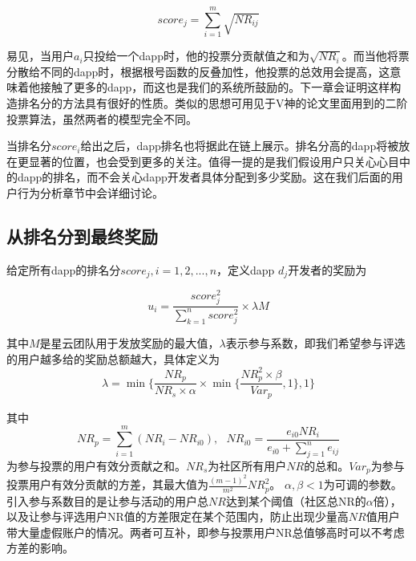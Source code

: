 $$score_j = \sum_{i=1}^m \sqrt{NR_{ij}}$$

易见，当用户$a_i$只投给一个dapp时，他的投票分贡献值之和为$\sqrt{NR_i}$。而当他将票分散给不同的dapp时，根据根号函数的反叠加性，他投票的总效用会提高，这意味着他接触了更多的dapp，而这也是我们的系统所鼓励的。下一章会证明这样构造排名分的方法具有很好的性质。类似的思想可用见于V神的论文\cite{buterin2018liberal}里面用到的二阶投票算法，虽然两者的模型完全不同。

当排名分$score_i$给出之后，dapp排名也将据此在链上展示。排名分高的dapp将被放在更显著的位置，也会受到更多的关注。值得一提的是我们假设用户只关心心目中的dapp的排名，而不会关心dapp开发者具体分配到多少奖励。这在我们后面的用户行为分析章节中会详细讨论。

\subsection{从排名分到最终奖励}
给定所有dapp的排名分$score_j,i=1,2,...,n$，定义dapp $d_j$开发者的奖励为

$$u_i = \frac{score_j^2}{\sum_{k=1}^n score_j^2}\times \lambda M$$

其中$M$是星云团队用于发放奖励的最大值，$\lambda $表示参与系数，即我们希望参与评选的用户越多给的奖励总额越大，具体定义为
$$\lambda=\min\{\frac{NR_p}{NR_s\times \alpha}\times \min\{\frac{NR_p^2\times \beta}{Var_p},1\},1\}$$

其中$$NR_p = \sum_{i=1}^m (NR_i-NR_{i0}),~~~NR_{i0} = \frac{e_{i0}NR_i}{e_{i0}+\sum_{j=1}^n {e_{ij}}}$$
为参与投票的用户有效分贡献之和。$NR_s$为社区所有用户$NR$的总和。$Var_p$为参与投票用户有效分贡献的方差，其最大值为$\frac{(m-1)^2}{m^2}NR_p^2$。
$\alpha,\beta<1$为可调的参数。引入参与系数目的是让参与活动的用户总$NR$达到某个阈值（社区总NR的$\alpha$倍），以及让参与评选用户NR值的方差限定在某个范围内，防止出现少量高$NR$值用户带大量虚假账户的情况。两者可互补，即参与投票用户NR总值够高时可以不考虑方差的影响。